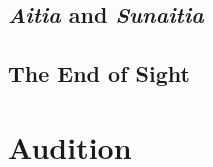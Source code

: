 
\subsection{\emph{Aitia} and \emph{Sunaitia}} %
\label{sub:_emph_aitia_and_emph_sunaitia}




\subsection{The End of Sight} %
\label{sub:the_end_of_sight}



\section{Audition} %
\label{sec:audition}




